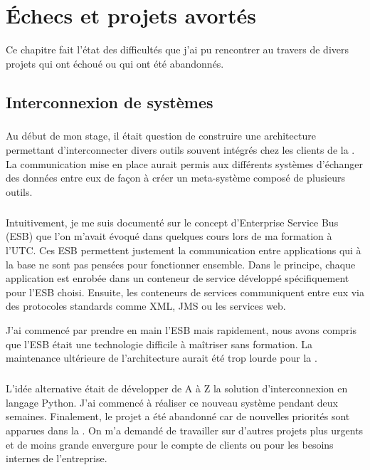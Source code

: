 \chapter{Échecs et projets avortés}
\label{section:avortes}

Ce chapitre fait l'état des difficultés que j'ai pu rencontrer au travers de divers projets qui ont échoué ou qui ont été abandonnés.



\section{Interconnexion de systèmes}

\paragraph{}
Au début de mon stage, il était question de construire une architecture permettant d'interconnecter divers outils souvent intégrés chez les clients de la \abusys.
La communication mise en place aurait permis aux différents systèmes d'échanger des données entre eux de façon à créer un \og meta-système \fg{} composé de plusieurs outils.

\paragraph{}
Intuitivement, je me suis documenté sur le concept d'Enterprise Service Bus (ESB) que l'on m'avait évoqué dans quelques cours lors de ma formation à l'UTC.
Ces ESB permettent justement la communication entre applications qui à la base ne sont pas pensées pour fonctionner ensemble.
Dans le principe, chaque application est enrobée dans un conteneur de service développé spécifiquement pour l'ESB choisi.
Ensuite, les conteneurs de services communiquent entre eux via des protocoles standards comme XML, JMS ou les services web.

J'ai commencé par prendre en main l'ESB \apetals{} mais rapidement, nous avons compris que l'ESB était une technologie difficile à maîtriser sans formation.
La maintenance ultérieure de l'architecture aurait été trop lourde pour la \abusys.

\paragraph{}
L'idée alternative était de développer de A à Z la solution d'interconnexion en langage Python.
J'ai commencé à réaliser ce nouveau système pendant deux semaines.
Finalement, le projet a été abandonné car de nouvelles priorités sont apparues dans la \abusys.
On m'a demandé de travailler sur d'autres projets plus urgents et de moins grande envergure pour le compte de clients ou pour les besoins internes de l'entreprise.



